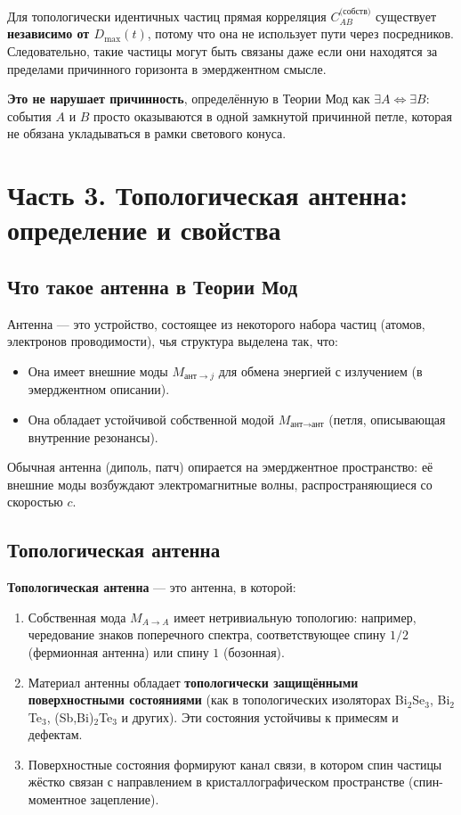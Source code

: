\documentclass[a4paper,12pt]{article}
\begin{document}
Для топологически идентичных частиц прямая корреляция \(C_{AB}^{\text{(собств)}}\) существует \textbf{независимо от \(D_{\max}(t)\)}, потому что она не использует пути через посредников. Следовательно, такие частицы могут быть связаны даже если они находятся за пределами причинного горизонта в эмерджентном смысле.

\textbf{Это не нарушает причинность}, определённую в Теории Мод как \(\exists A \Leftrightarrow \exists B\): события \(A\) и \(B\) просто оказываются в одной замкнутой причинной петле, которая не обязана укладываться в рамки светового конуса.

\section*{Часть 3. Топологическая антенна: определение и свойства}

\subsection{Что такое антенна в Теории Мод}
Антенна — это устройство, состоящее из некоторого набора частиц (атомов, электронов проводимости), чья структура выделена так, что:
\begin{itemize}
    \item Она имеет внешние моды \(M_{\text{ант}\to j}\) для обмена энергией с излучением (в эмерджентном описании).
    \item Она обладает устойчивой собственной модой \(M_{\text{ант}\to \text{ант}}\) (петля, описывающая внутренние резонансы).
\end{itemize}
Обычная антенна (диполь, патч) опирается на эмерджентное пространство: её внешние моды возбуждают электромагнитные волны, распространяющиеся со скоростью \(c\).

\subsection{Топологическая антенна}
\textbf{Топологическая антенна} — это антенна, в которой:
\begin{enumerate}
    \item Собственная мода \(M_{A\to A}\) имеет нетривиальную топологию: например, чередование знаков поперечного спектра, соответствующее спину \(1/2\) (фермионная антенна) или спину \(1\) (бозонная).
    \item Материал антенны обладает \textbf{топологически защищёнными поверхностными состояниями} (как в топологических изоляторах Bi\(_2\)Se\(_3\), Bi\(_2\)Te\(_3\), (Sb,Bi)\(_2\)Te\(_3\) и других). Эти состояния устойчивы к примесям и дефектам.
    \item Поверхностные состояния формируют канал связи, в котором спин частицы жёстко связан с направлением в кристаллографическом пространстве (спин-моментное зацепление).
\end{enumerate}
\end{document}
